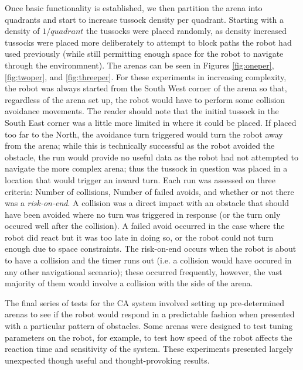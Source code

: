 \documentclass[a4paper,11pt,twoside,openright]{article}
\begin{document}
Once basic functionality is established, we then partition the arena into quadrants and start to increase tussock density per quadrant.
Starting with a density of $1/\textit{quadrant}$ the tussocks were placed randomly, as density increased tussocks were placed more
deliberately to attempt to block paths the robot had used previously (while still permitting enough space for the robot to navigate
through the environmnent). The arenas can be seen in Figures \ref{fig:oneper}, \ref{fig:twoper}, and \ref{fig:threeper}.
For these experiments in increasing complexity, the robot was always started from the South West corner
of the arena so that, regardless of the arena set up, the robot would have to perform some collision avoidance movements. The reader
should note that the initial tussock in the South East corner was a little more limited in where it could be placed. If placed too
far to the North, the avoidance turn triggered would turn the robot away from the arena; while this is technically successful as the
robot avoided the obstacle, the run would provide no useful data as the robot had not attempted to navigate the more complex arena; thus
the tussock in question was placed in a location that would trigger an inward turn. Each run was assessed on three criteria: Number of collisions,
Number of failed avoids, and whether or not there was a \textit{risk-on-end}. A collision was a direct impact with an obstacle that
should have been avoided where no turn was triggered in response (or the turn only occured well after the collision). A failed avoid occurred in
the case where the robot did react but it was too late in doing so, or the robot could not turn enough due to space constraints. The
risk-on-end occurs when the robot is about to have a collision and the timer runs out (i.e. a collision would have occured in any other
navigational scenario); these occurred frequently, however, the vast majority of them would involve a collision with the side of the arena.
\newline

The final series of tests for the CA system involved setting up pre-determined arenas to see if the robot would respond in a predictable
fashion when presented with a particular pattern of obstacles. Some arenas were designed to test tuning parameters on the robot, for example,
to test how speed of the robot affects the reaction time and sensitivity of the system. These experiments presented largely unexpected though
useful and thought-provoking results.
\newline
\end{document}
